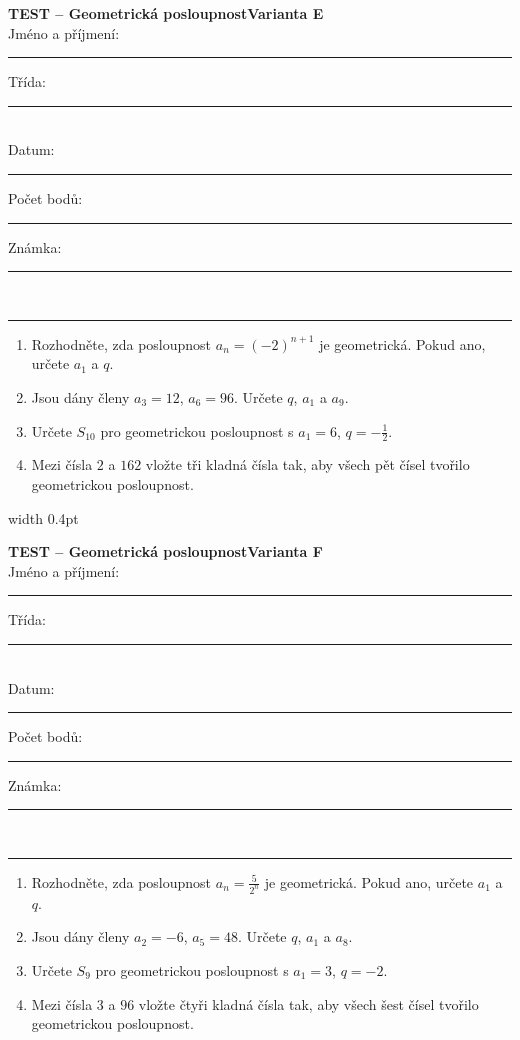 \documentclass[a4paper,10pt,landscape]{article}
\newcommand{\TestTitle}{Geometrická posloupnost}
\newcommand{\TestHeader}[1]{%
    {\bfseries TEST -- \TestTitle}\hfill{\bfseries Varianta #1}\\[2mm]
    Jméno a příjmení: \rule{4.5cm}{0.4pt}\hfill Třída: \rule{1.5cm}{0.4pt}\\[2mm]
    Datum: \rule{2.4cm}{0.4pt}\hfill Počet bodů: \rule{1.4cm}{0.4pt}\hfill Známka: \rule{1.4cm}{0.4pt}\\[1mm]
    \hrule\vspace{3mm}
}
\newcommand{\AnswerSpace}[1]{\vspace{#1}}
\begin{document}
\noindent
\begin{minipage}[t]{0.48\textwidth}
    \small
    \TestHeader{E}

    \begin{enumerate}
        \item Rozhodněte, zda posloupnost $a_n=(-2)^{n+1}$ je geometrická. Pokud ano, určete $a_1$ a $q$.
        \AnswerSpace{19mm}
        \item Jsou dány členy $a_3=12$, $a_6=96$. Určete $q$, $a_1$ a $a_9$.
        \AnswerSpace{33mm}
        \item Určete $S_{10}$ pro geometrickou posloupnost s $a_1=6$, $q=-\frac12$.
        \AnswerSpace{34mm}
        \item Mezi čísla $2$ a $162$ vložte tři kladná čísla tak, aby všech pět čísel tvořilo geometrickou posloupnost.
        \AnswerSpace{29mm}
    \end{enumerate}
\end{minipage}%
\hfill\vrule width 0.4pt\hfill
\begin{minipage}[t]{0.48\textwidth}
    \small
    \TestHeader{F}

    \begin{enumerate}
        \item Rozhodněte, zda posloupnost $a_n=\frac{5}{2^n}$ je geometrická. Pokud ano, určete $a_1$ a $q$.
        \AnswerSpace{19mm}
        \item Jsou dány členy $a_2=-6$, $a_5=48$. Určete $q$, $a_1$ a $a_8$.
        \AnswerSpace{33mm}
        \item Určete $S_9$ pro geometrickou posloupnost s $a_1=3$, $q=-2$.
        \AnswerSpace{34mm}
        \item Mezi čísla $3$ a $96$ vložte čtyři kladná čísla tak, aby všech šest čísel tvořilo geometrickou posloupnost.
        \AnswerSpace{29mm}
    \end{enumerate}
\end{minipage}
\end{document}
